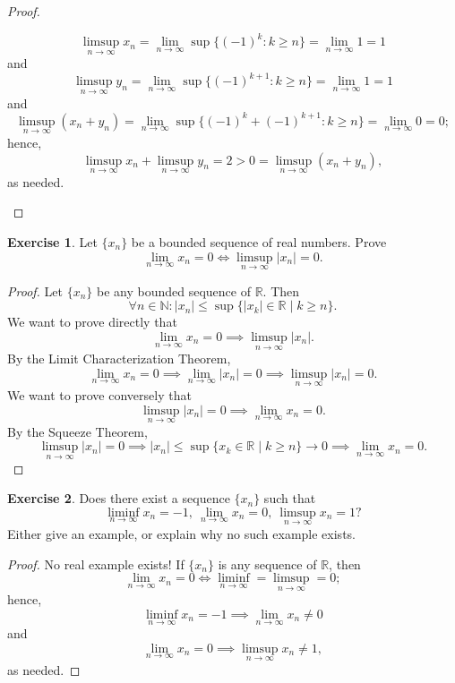 \documentclass[12pt]{article}
\theoremstyle{definition}
\newtheorem{exercise}{Exercise}
\begin{document}
\begin{proof}
\begin{enumerate}[label=\alph*)]
        \[
            \limsup_{n \to \infty}x_n = \lim_{n \to \infty}\sup\{(-1)^k : k \geq n\} = \lim_{n \to \infty}1 = 1 
        \]
        and
        \[
            \limsup_{n \to \infty}y_n = \lim_{n \to \infty}\sup\{(-1)^{k + 1} : k \geq n\} = \lim_{n \to \infty}1 = 1 
        \]
        and
        \[
            \limsup_{n \to \infty}(x_n + y_n) = \lim_{n \to \infty}\sup\{(-1)^k + (-1)^{k + 1} : k \geq n\} = \lim_{n \to \infty}0 = 0;
        \]
        hence,
        \[
            \limsup_{n \to \infty}x_n + \limsup_{n \to \infty}y_n = 2 > 0 = \limsup_{n \to \infty}(x_n + y_n),
        \]
        as needed.
    \end{enumerate}
\end{proof}

\begin{exercise}
    Let $\{x_n\}$ be a bounded sequence of real numbers. Prove
    \[
        \lim_{n \to \infty}x_n = 0 \iff \limsup_{n \to \infty}\vert x_n \vert = 0.
    \]
\end{exercise}

\begin{proof}
    Let $\{x_n\}$ be any bounded sequence of $\mathbb{R}$. Then
    \[
        \forall n \in \mathbb{N} : \vert x_n \vert \leq \sup\{\vert x_k \vert \in \mathbb{R} \mid k \geq n\}.
    \]
    We want to prove directly that
    \[
        \lim_{n \to \infty}x_n = 0 \implies \limsup_{n \to \infty}\vert x_n \vert.
    \]
    By the Limit Characterization Theorem,
    \[
        \lim_{n \to \infty}x_n = 0 \implies \lim_{n \to \infty}\vert x_n \vert = 0 \implies \limsup_{n \to \infty}\vert x_n \vert = 0.
    \]
    We want to prove conversely that 
    \[
        \limsup_{n \to \infty}\vert x_n \vert = 0 \implies \lim_{n \to \infty}x_n = 0.
    \]
    By the Squeeze Theorem,
    \[
        \limsup_{n \to \infty}\vert x_n \vert = 0 \implies \vert x_n \vert \leq \sup\{x_k \in \mathbb{R} \mid k \geq n\} \rightarrow 0 \implies \lim_{n \to \infty}x_n = 0.
    \]
\end{proof}

\begin{exercise}
    Does there exist a sequence $\{x_n\}$ such that
    \[
        \liminf_{n \to \infty}x_n = -1, \ \lim_{n \to \infty}x_n = 0, \ \limsup_{n \to \infty}x_n = 1?
    \]
    Either give an example, or explain why no such example exists.
\end{exercise}

\begin{proof}
    No real example exists! If $\{x_n\}$ is any sequence of $\mathbb{R}$, then
    \[
        \lim_{n \to \infty}x_n = 0 \iff \liminf_{n \to \infty} = \limsup_{n \to \infty} = 0;
    \]
    hence,
    \[
        \liminf_{n \to \infty}x_n = -1 \implies \lim_{n \to \infty}x_n \neq 0
    \]
    and 
    \[
        \lim_{n \to \infty}x_n = 0 \implies \limsup_{n \to \infty}x_n \neq 1,
    \]
    as needed.
\end{proof}
\end{document}
